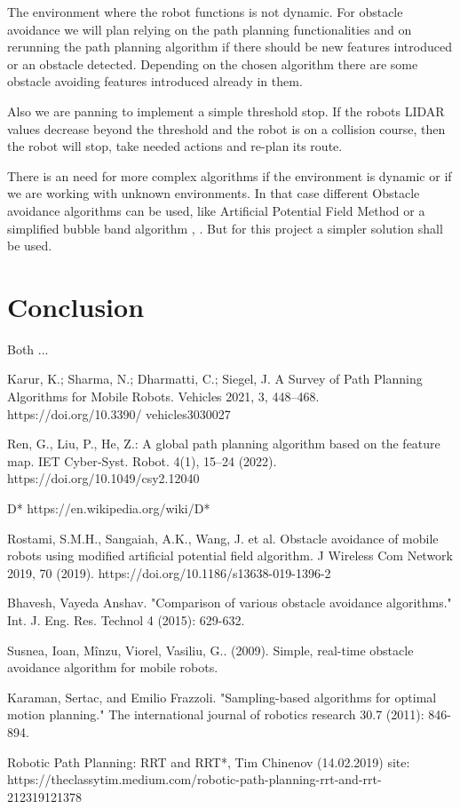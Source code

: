 \documentclass[12pt, a4paper, onecolumn]{article}
\begin{document}
The environment where the robot functions is not dynamic. For obstacle avoidance we will plan relying on the path planning functionalities and on rerunning the path planning algorithm if there should be new features introduced or an obstacle detected. Depending on the chosen algorithm there are some obstacle avoiding features introduced already in them. 

Also we are panning to implement a simple threshold stop. If the robots LIDAR values decrease beyond the threshold and the robot is on a collision course, then the robot will stop, take needed actions and re-plan its route.  

There is an need for more complex algorithms if the environment is dynamic or if we are working with unknown environments. In that case different Obstacle avoidance algorithms can be used, like Artificial Potential Field Method \cite{Rostami19} or a simplified bubble band algorithm\cite{OA09} ,  \cite{OA15}. But for this project a simpler solution shall be used.

\section{Conclusion}

Both ... 
\newpage
\begin{thebibliography}{9}

Karur, K.; Sharma, N.;
Dharmatti, C.; Siegel, J. A Survey of
Path Planning Algorithms for Mobile
Robots. Vehicles 2021, 3, 448–468.
https://doi.org/10.3390/
vehicles3030027

Ren, G., Liu, P., He, Z.: A
global path planning algorithm based on the feature
map. IET Cyber‐Syst. Robot. 4(1), 15–24 (2022).
https://doi.org/10.1049/csy2.12040

D*
https://en.wikipedia.org/wiki/D*

Rostami, S.M.H., Sangaiah, A.K., Wang, J. et al. Obstacle avoidance of mobile robots using modified artificial potential field algorithm. J Wireless Com Network 2019, 70 (2019). https://doi.org/10.1186/s13638-019-1396-2

Bhavesh, Vayeda Anshav. "Comparison of various obstacle avoidance algorithms." Int. J. Eng. Res. Technol 4 (2015): 629-632.

Susnea, Ioan, Mînzu, Viorel, Vasiliu, G.. (2009). Simple, real-time obstacle avoidance algorithm for mobile robots. 

Karaman, Sertac, and Emilio Frazzoli. "Sampling-based algorithms for optimal motion planning." The international journal of robotics research 30.7 (2011): 846-894.

Robotic Path Planning: RRT and RRT*, Tim Chinenov (14.02.2019) site: https://theclassytim.medium.com/robotic-path-planning-rrt-and-rrt-212319121378

\end{thebibliography}
\end{document}

